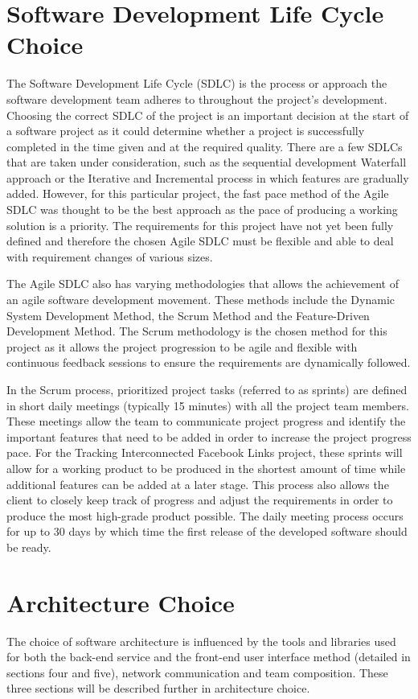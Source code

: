 \documentclass[10pt,onecolumn]{article}
\begin{document}
\section{Software Development Life Cycle Choice}
The Software Development Life Cycle (SDLC) is the process or approach the software development team adheres to throughout the project's development. Choosing the correct SDLC of the project is an important decision at the start of a software project as it could determine whether a project is successfully completed in the time given and at the required quality. There are a few SDLCs that are taken under consideration, such as the sequential development Waterfall approach or the Iterative and Incremental process in which features are gradually added. However, for this particular project, the fast pace method of the Agile SDLC was thought to be the best approach as the pace of producing a working solution is a priority. The requirements for this project have not yet been fully defined and therefore the chosen Agile SDLC must be flexible and able to deal with requirement changes of various sizes.

The Agile SDLC also has varying methodologies that allows the achievement of an agile software development movement. These methods include the Dynamic System Development Method, the Scrum Method and the Feature-Driven Development Method. The Scrum methodology is the chosen method for this project as it allows the project progression to be agile and flexible with continuous feedback sessions to ensure the requirements are dynamically followed\cite{Kinsey}.

In the Scrum process, prioritized project tasks (referred to as sprints) are defined in short daily meetings (typically 15 minutes) with all the project team members. These meetings allow the team to communicate project progress and identify the important features that need to be added in order to increase the project progress pace. For the Tracking Interconnected Facebook Links project, these sprints will allow for a working product to be produced in the shortest amount of time while additional features can be  added at a later stage. This process also allows the client to closely keep track of progress and adjust the requirements in order to produce the most high-grade product possible. The daily meeting process occurs for up to 30 days by which time the first release of the developed software should be ready.   


\section{Architecture Choice}
The choice of software architecture is influenced by the tools and libraries used for both the back-end service and the front-end user interface method (detailed in sections four and five), network communication and team composition. These three sections will be described further in architecture choice. 
\end{document}
